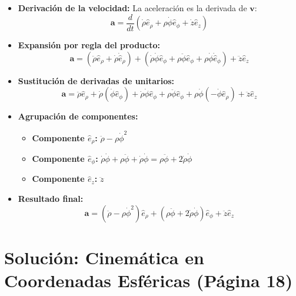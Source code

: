 \documentclass[a4paper]{article}
\begin{document}
\begin{itemize}
    \item \textbf{Derivación de la velocidad:} La aceleración es la derivada de $\mathbf{v}$:
    \begin{equation*}
        \mathbf{a} = \frac{d}{dt} (\dot{\rho} \hat{e}_\rho + \rho \dot{\phi} \hat{e}_\phi + \dot{z} \hat{e}_z)
    \end{equation*}
    
    \item \textbf{Expansión por regla del producto:}
    \begin{equation*}
        \mathbf{a} = (\ddot{\rho} \hat{e}_\rho + \dot{\rho} \dot{\hat{e}}_\rho) + (\dot{\rho} \dot{\phi} \hat{e}_\phi + \rho \ddot{\phi} \hat{e}_\phi + \rho \dot{\phi} \dot{\hat{e}}_\phi) + \ddot{z} \hat{e}_z
    \end{equation*}
    
    \item \textbf{Sustitución de derivadas de unitarios:}
    \begin{equation*}
        \mathbf{a} = \ddot{\rho} \hat{e}_\rho + \dot{\rho} (\dot{\phi} \hat{e}_\phi) + \dot{\rho} \dot{\phi} \hat{e}_\phi + \rho \ddot{\phi} \hat{e}_\phi + \rho \dot{\phi} (-\dot{\phi} \hat{e}_\rho) + \ddot{z} \hat{e}_z
    \end{equation*}
    
    \item \textbf{Agrupación de componentes:}
    \begin{itemize}
        \item \textbf{Componente $\hat{e}_\rho$:} $\ddot{\rho} - \rho \dot{\phi}^2$
        \item \textbf{Componente $\hat{e}_\phi$:} $\dot{\rho} \dot{\phi} + \rho \ddot{\phi} + \dot{\rho} \dot{\phi} = \rho \ddot{\phi} + 2 \dot{\rho} \dot{\phi}$
        \item \textbf{Componente $\hat{e}_z$:} $\ddot{z}$
    \end{itemize}
    
    \item \textbf{Resultado final:}
    \begin{equation*}
        \mathbf{a} = (\ddot{\rho} - \rho\dot{\phi}^2)\hat{e}_\rho + (\rho\ddot{\phi} + 2\dot{\rho}\dot{\phi})\hat{e}_\phi + \ddot{z}\hat{e}_z \text{}
    \end{equation*}
\end{itemize}

\section*{Solución: Cinemática en Coordenadas Esféricas (Página 18)}
\end{document}
